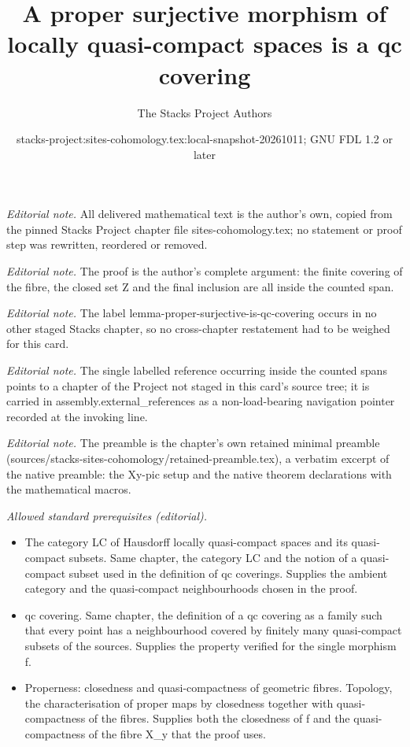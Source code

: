 \documentclass[10pt,a4paper]{amsart}
\title{A proper surjective morphism of locally quasi-compact spaces is a qc covering}
\author{The Stacks Project Authors}
\date{stacks-project:sites-cohomology.tex:local-snapshot-20261011; GNU FDL 1.2 or later}
\theoremstyle{plain}
\theoremstyle{definition}
\theoremstyle{remark}
\numberwithin{equation}{subsection}
\begin{document}
\maketitle
\noindent\textit{Editorial note.} All delivered mathematical text is the author's own, copied from the pinned Stacks Project chapter file sites-cohomology.tex; no statement or proof step was rewritten, reordered or removed.\par\medskip
\noindent\textit{Editorial note.} The proof is the author's complete argument: the finite covering of the fibre, the closed set Z and the final inclusion are all inside the counted span.\par\medskip
\noindent\textit{Editorial note.} The label lemma-proper-surjective-is-qc-covering occurs in no other staged Stacks chapter, so no cross-chapter restatement had to be weighed for this card.\par\medskip
\noindent\textit{Editorial note.} The single labelled reference occurring inside the counted spans points to a chapter of the Project not staged in this card's source tree; it is carried in assembly.external\_references as a non-load-bearing navigation pointer recorded at the invoking line.\par\medskip
\noindent\textit{Editorial note.} The preamble is the chapter's own retained minimal preamble (sources/stacks-sites-cohomology/retained-preamble.tex), a verbatim excerpt of the native preamble: the Xy-pic setup and the native theorem declarations with the mathematical macros.\par\medskip
\noindent\textit{Allowed standard prerequisites (editorial).}\begin{itemize}
\item The category LC of Hausdorff locally quasi-compact spaces and its quasi-compact subsets. Same chapter, the category LC and the notion of a quasi-compact subset used in the definition of qc coverings. Supplies the ambient category and the quasi-compact neighbourhoods chosen in the proof.
\item qc covering. Same chapter, the definition of a qc covering as a family such that every point has a neighbourhood covered by finitely many quasi-compact subsets of the sources. Supplies the property verified for the single morphism f.
\item Properness: closedness and quasi-compactness of geometric fibres. Topology, the characterisation of proper maps by closedness together with quasi-compactness of the fibres. Supplies both the closedness of f and the quasi-compactness of the fibre X\_y that the proof uses.
\end{itemize}\medskip
\end{document}
